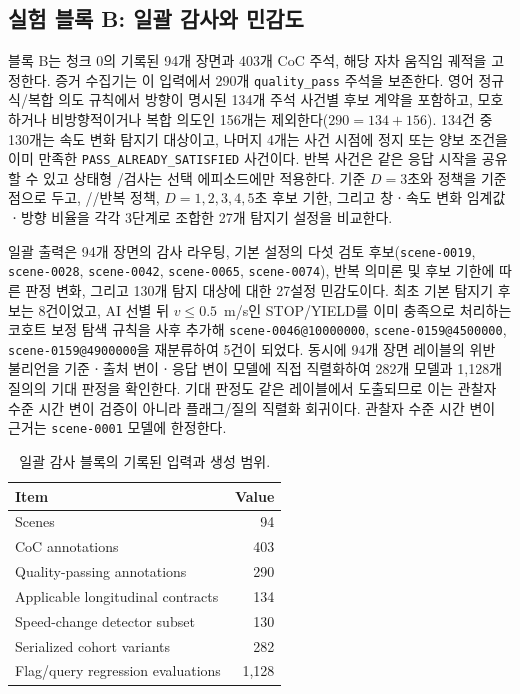 \subsection{실험 블록 B: 일괄 감사와 민감도}
\label{sec:exp-block-b}

블록 B는 청크 0의 기록된 94개 장면과 403개 CoC 주석, 해당 자차 움직임 궤적을 고정한다. 증거 수집기는 이 입력에서 290개 \texttt{quality\_pass} 주석을 보존한다. 영어 정규식/복합 의도 규칙에서 방향이 명시된 134개 주석 사건별 후보 계약을 포함하고, 모호하거나 비방향적이거나 복합 의도인 156개는 제외한다($290=134+156$). 134건 중 130개는 속도 변화 탐지기 대상이고, 나머지 4개는 사건 시점에 정지 또는 양보 조건을 이미 만족한 \texttt{PASS\_ALREADY\_SATISFIED} 사건이다. 반복 사건은 같은 응답 시작을 공유할 수 있고 상태형 \preserve/\reset 검사는 선택 에피소드에만 적용한다. 기준 $D=3$초와 \preserve 정책을 기준점으로 두고, \preserve/\reset/\dedup 반복 정책, $D=1,2,3,4,5$초 후보 기한, 그리고 창ㆍ속도 변화 임계값ㆍ방향 비율을 각각 3단계로 조합한 27개 탐지기 설정을 비교한다.

일괄 출력은 94개 장면의 감사 라우팅, 기본 설정의 다섯 검토 후보(\texttt{scene-0019}, \texttt{scene-0028}, \texttt{scene-0042}, \texttt{scene-0065}, \texttt{scene-0074}), 반복 의미론 및 후보 기한에 따른 판정 변화, 그리고 130개 탐지 대상에 대한 27설정 민감도이다. 최초 기본 탐지기 후보는 8건이었고, AI 선별 뒤 $v\leq0.5$~m/s인 STOP/YIELD를 이미 충족으로 처리하는 코호트 보정 탐색 규칙을 사후 추가해 \texttt{scene-0046@10000000}, \texttt{scene-0159@4500000}, \texttt{scene-0159@4900000}을 재분류하여 5건이 되었다. 동시에 94개 장면 레이블의 위반 불리언을 기준ㆍ출처 변이ㆍ응답 변이 모델에 직접 직렬화하여 282개 모델과 1,128개 질의의 기대 판정을 확인한다. 기대 판정도 같은 레이블에서 도출되므로 이는 관찰자 수준 시간 변이 검증이 아니라 플래그/질의 직렬화 회귀이다. 관찰자 수준 시간 변이 근거는 \texttt{scene-0001} 모델에 한정한다.

\begin{table}[t]
\centering
\caption{일괄 감사 블록의 기록된 입력과 생성 범위.}
\label{tab:batch-size}
\begin{tabular}{lr}
\toprule
Item & Value \\
\midrule
Scenes & 94 \\
CoC annotations & 403 \\
Quality-passing annotations & 290 \\
Applicable longitudinal contracts & 134 \\
Speed-change detector subset & 130 \\
Serialized cohort variants & 282 \\
Flag/query regression evaluations & 1,128 \\
\bottomrule
\end{tabular}
\end{table}

